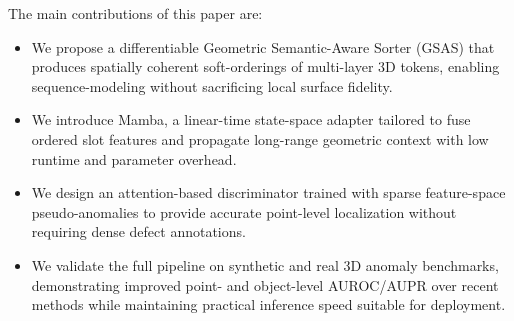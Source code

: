 The main contributions of this paper are:
\begin{itemize}
  \item We propose a differentiable Geometric Semantic-Aware Sorter (GSAS) that produces spatially coherent soft-orderings of multi-layer 3D tokens, enabling sequence-modeling without sacrificing local surface fidelity.
  \item We introduce Mamba, a linear-time state-space adapter tailored to fuse ordered slot features and propagate long-range geometric context with low runtime and parameter overhead.
  \item We design an attention-based discriminator trained with sparse feature-space pseudo-anomalies to provide accurate point-level localization without requiring dense defect annotations.
  \item We validate the full pipeline on synthetic and real 3D anomaly benchmarks, demonstrating improved point- and object-level AUROC/AUPR over recent methods while maintaining practical inference speed suitable for deployment.
\end{itemize}